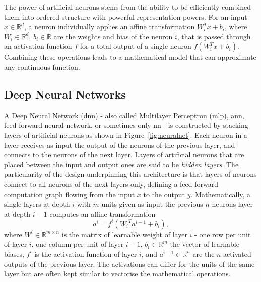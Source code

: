 The power of artificial neurons stems from the ability to be efficiently combined them into ordered structure with powerful representation powers. For an input $x \in \mathbb{R}^d$, a neuron individually applies an affine transformation $W_i^T x + b_i$, where $W_i \in \mathbb{R}^d,\,b_i \in \mathbb{R}$ are the weights and bias of the neuron $i$, that is passed through an activation function $f$ for a total output of a single neuron $f(W_i^T x + b_i)$. Combining these operations leads to a mathematical model that can approximate any continuous function. 

\subsection{Deep Neural Networks}
A Deep Neural Network (\gls{dnn}) - also called Multilayer Perceptron (\gls{mlp}), \gls{ann}, feed-forward neural network, or sometimes only \gls{nn} - is constructed by stacking layers of artificial neurons as shown in Figure~\ref{fig:neuralnet}. Each neuron in a layer receives as input the output of the neurons of the previous layer, and connects to the neurons of the next layer. Layers of artificial neurons that are placed between the input and output ones are said to be \textit{hidden layers}. The particularity of the design underpinning this architecture is that layers of neurons connect to all neurons of the next layers only, defining a feed-forward computation graph flowing from the input $x$ to the output $y$. Mathematically, a single layers at depth $i$ with $m$ units given as input the previous $n$-neurons layer at depth $i-1$ computes an affine transformation
\begin{equation}\label{eq:feedforward}
    a^i = f^i\left({W_i}^T a^{i-1} + b_i\right),
\end{equation}
where $W^i \in \mathbb{R}^{m \times n}$ is the matrix of learnable weight of layer $i$ - one row per unit of layer $i$, one column per unit of layer $i-1$, $b_i \in \mathbb{R}^m$ the vector of learnable biases, $f^i$ is the activation function of layer $i$, and $a^{i-1} \in \mathbb{R}^n$ are the $n$ activated outputs of the previous layer. The activations can differ for the units of the same layer but are often kept similar to vectorise the mathematical operations. 

